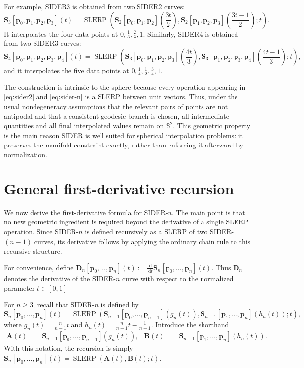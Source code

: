 \documentclass[a4paper,11pt]{article}
\newcommand{\bp}{\mathbf{p}}
\newcommand{\bA}{\mathbf{A}}
\newcommand{\bB}{\mathbf{B}}
\newcommand{\bD}{\mathbf{D}}
\numberwithin{equation}{section}
\theoremstyle{plain}
\theoremstyle{definition}
\theoremstyle{remark}
\newcommand{\Sph}{\mathbb{S}^2}
\newcommand{\slerp}{\operatorname{SLERP}}
\newcommand{\dd}{\,\mathrm{d}}
\begin{document}
For example, SIDER3 is obtained from two SIDER2 curves:
\[
        \mathbf{S}_3[\bp_0,\bp_1,\bp_2,\bp_3](t)
        =
        \slerp\!\left(
        \mathbf{S}_2[\bp_0,\bp_1,\bp_2]\!\left(\frac{3t}{2}\right),
        \mathbf{S}_2[\bp_1,\bp_2,\bp_3]\!\left(\frac{3t-1}{2}\right);
        t
        \right).
\]
It interpolates the four data points at
\(0,\frac13, \frac23,1.\)
Similarly, SIDER4 is obtained from two SIDER3 curves:
\[
        \mathbf{S}_4[\bp_0,\bp_1,\bp_2,\bp_3,\bp_4](t)
        =
        \slerp\!\left(
        \mathbf{S}_3[\bp_0,\bp_1,\bp_2,\bp_3]\!\left(\frac{4t}{3}\right),
        \mathbf{S}_3[\bp_1,\bp_2,\bp_3,\bp_4]\!\left(\frac{4t-1}{3}\right);
        t
        \right),
\]
and it interpolates the five data points at
\(0, \frac14,\frac12,\frac34,1.\)

The construction is intrinsic to the sphere because every operation appearing in \eqref{eq:sider2} and \eqref{eq:sider-n} is a SLERP between unit vectors.  Thus, under the usual nondegeneracy assumptions that the relevant pairs of points are not antipodal and that a consistent geodesic branch is chosen, all intermediate quantities and all final interpolated values remain on $\Sph$.  This geometric property is the main reason SIDER is well suited for spherical interpolation problems: it preserves the manifold constraint exactly, rather than enforcing it afterward by normalization.

\section{General first-derivative recursion}\label{sec:general-recursion}

We now derive the first-derivative formula for SIDER-$n$.  The main point is that no new geometric ingredient is required beyond the derivative of a single SLERP operation.  Since SIDER-$n$ is defined recursively as a SLERP of two SIDER-$(n-1)$ curves, its derivative follows by applying the ordinary chain rule to this recursive structure.

For convenience, define
\(\bD_n[\bp_0,\ldots,\bp_n](t) := \frac{\dd}{\dd t}\mathbf{S}_n[\bp_0,\ldots,\bp_n](t).\)
Thus $\bD_n$ denotes the derivative of the SIDER-$n$ curve with respect to the normalized parameter $t\in[0,1]$.

For $n\geq 3$, recall that SIDER-$n$ is defined by
\[
        \mathbf{S}_n[\bp_0,\ldots,\bp_n](t)
        =
        \slerp\!\left(
        \mathbf{S}_{n-1}[\bp_0,\ldots,\bp_{n-1}](g_n(t)),
        \mathbf{S}_{n-1}[\bp_1,\ldots,\bp_n](h_n(t));
        t
        \right),
\]
where
\(g_n(t)=\frac{n}{n-1}t\) and \(h_n(t)=\frac{n}{n-1}t-\frac{1}{n-1}\).
Introduce the shorthand
\[
\begin{aligned}
\bA(t)&=\mathbf{S}_{n-1}[\bp_0,\ldots,\bp_{n-1}](g_n(t)),&
\bB(t)&=\mathbf{S}_{n-1}[\bp_1,\ldots,\bp_n](h_n(t)).
\end{aligned}
\]
With this notation, the recursion is simply \(\mathbf{S}_n[\bp_0,\ldots,\bp_n](t)=\slerp(\bA(t),\bB(t);t)\).
\end{document}

